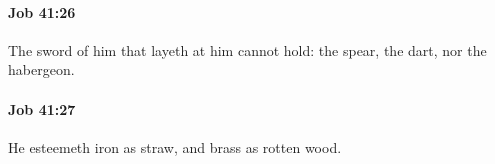 		\paragraph{Job 41:26} %
			\label{JOB-41-26}

			The sword of him that layeth at him cannot hold: the spear, the dart, nor the habergeon.


		\paragraph{Job 41:27} %
			\label{JOB-41-27}

			He esteemeth iron as straw, and brass as rotten wood.


